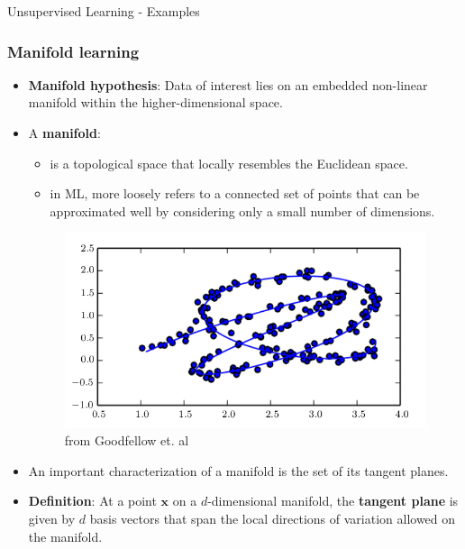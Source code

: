\begin{vbframe} {Unsupervised Learning - Examples}
\end{vbframe}


\begin{vbframe}
\frametitle{Manifold learning}

  \begin{itemize}
        \item \textbf{Manifold hypothesis}: 
        Data of interest lies on an embedded non-linear manifold within the higher-dimensional space.
        \item A \textbf{manifold}: 
        \begin{itemize}
        \item  is a topological space that locally resembles the Euclidean space.
        \item  in ML, more loosely refers to a connected set of points that can be approximated well by considering only a small number of dimensions. 
        \end{itemize}
          \begin{figure}[h]
                \centering
                \includegraphics[width=5  cm]{plots/manifold.png}
                \caption{
                from Goodfellow et. al%
                }
            \end{figure}
           \end{itemize}    
       \framebreak
 
\begin{itemize}
    \item An important characterization of a manifold is the set of its tangent planes.
    \item \textbf{Definition}: At a point $\pmb{x}$ on a $d$-dimensional manifold, the \textbf{tangent plane} is given by $d$ basis vectors that span the local directions of variation allowed on the manifold.
    

\end{itemize}
\end{vbframe}

